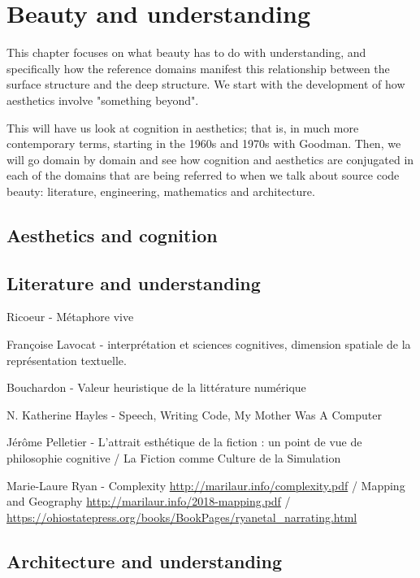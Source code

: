\chapter{Beauty and understanding}
\label{chap:beauty}

This chapter focuses on what beauty has to do with understanding, and specifically how the reference domains manifest this relationship between the surface structure and the deep structure. We start with the development of how aesthetics involve "something beyond".

This will have us look at cognition in aesthetics; that is, in much more contemporary terms, starting in the 1960s and 1970s with Goodman. Then, we will go domain by domain and see how cognition and aesthetics are conjugated in each of the domains that are being referred to when we talk about source code beauty: literature, engineering, mathematics and architecture.


\section{Aesthetics and cognition}
\label{sec:aesthetic-cognition}

\section{Literature and understanding}
\label{sec:aesthetic-literature}

Ricoeur - Métaphore vive

Françoise Lavocat - interprétation et sciences cognitives, dimension spatiale de la représentation textuelle.

Bouchardon - Valeur heuristique de la littérature numérique

N. Katherine Hayles - Speech, Writing Code, My Mother Was A Computer

Jérôme Pelletier -  L'attrait esthétique de la fiction : un point de vue de philosophie cognitive /  La Fiction comme Culture de la Simulation 

Marie-Laure Ryan - Complexity \url{http://marilaur.info/complexity.pdf} / Mapping and Geography \url{http://marilaur.info/2018-mapping.pdf} / \url{https://ohiostatepress.org/books/BookPages/ryanetal_narrating.html}

\section{Architecture and understanding}
\label{sec:arch-understanding}

